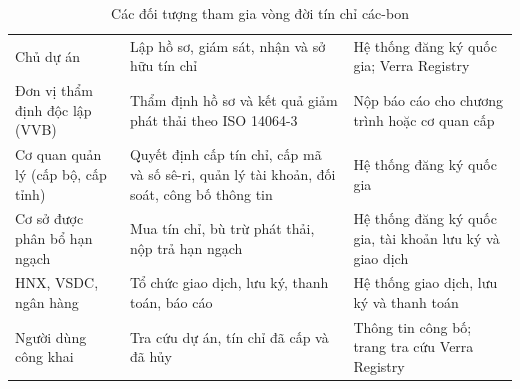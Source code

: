 \begin{table}[!htbp]
    \centering
    \caption{Các đối tượng tham gia vòng đời tín chỉ các-bon}
    \label{tab:ks-tacnhan}
    \label{tab:ks-doituong}
    \small
    \begin{tabularx}{\textwidth}{|L{3.3cm}|Y|L{3.8cm}|}
        \hline
         &  &  \\
        \hline
        Chủ dự án & Lập hồ sơ, giám sát, nhận và sở hữu tín chỉ & Hệ thống đăng ký quốc gia; Verra Registry \\
        \hline
        Đơn vị thẩm định độc lập (VVB) & Thẩm định hồ sơ và kết quả giảm phát thải theo ISO 14064-3 & Nộp báo cáo cho chương trình hoặc cơ quan cấp \\
        \hline
        Cơ quan quản lý (cấp bộ, cấp tỉnh) & Quyết định cấp tín chỉ, cấp mã và số sê-ri, quản lý tài khoản, đối soát, công bố thông tin & Hệ thống đăng ký quốc gia \\
        \hline
        Cơ sở được phân bổ hạn ngạch & Mua tín chỉ, bù trừ phát thải, nộp trả hạn ngạch & Hệ thống đăng ký quốc gia, tài khoản lưu ký và giao dịch \\
        \hline
        HNX, VSDC, ngân hàng & Tổ chức giao dịch, lưu ký, thanh toán, báo cáo & Hệ thống giao dịch, lưu ký và thanh toán \\
        \hline
        Người dùng công khai & Tra cứu dự án, tín chỉ đã cấp và đã hủy & Thông tin công bố; trang tra cứu Verra Registry \\
        \hline
    \end{tabularx}
\end{table}

